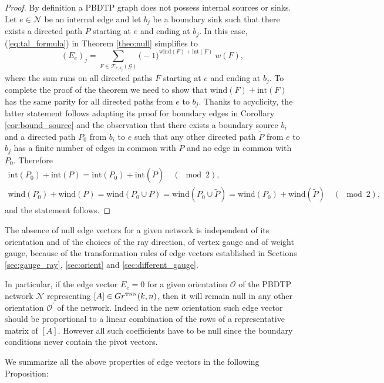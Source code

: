 \documentclass[11pt]{amsart}
\theoremstyle{plain}
\numberwithin{equation}{section}
\def \GTNN {{Gr^{\mbox{\tiny TNN}} (k,n)}}
\begin{document}
\begin{proof}
By definition a PBDTP graph does not possess internal sources or sinks.
Let $e\in {\mathcal N}$ be an internal edge and let $b_j$ be a boundary sink such that there exists a directed path $P$ starting at $e$ and ending at $b_j$.  In this case, (\ref{eq:tal_formula}) in Theorem \ref{theo:null} simplifies to
\[
\left(E_{e}\right)_{j}= \displaystyle\sum\limits_{F\in {\mathcal F}_{e,b_j}(\mathcal G)} \big(-1\big)^{\mbox{wind}(F)+\mbox{int}(F)}\ w(F),
\]
where the sum runs on all directed paths $F$ starting at $e$ and ending at $b_j$. To complete the proof of the theorem we need to show that $\mbox{wind}(F)+\mbox{int}(F)$ has the same parity for all directed paths from $e$ to $b_j$. Thanks to acyclicity, the latter statement follows adapting its proof for boundary edges in Corollary \ref{cor:bound_source} and the observation that there exists a boundary source $b_i$ and a directed path $P_0$ from $b_i$ to $e$ such that any other directed path ${\tilde P}$ from $e$ to $b_j$ has a finite number of edges in common with $P$
and no edge in common with $P_0$.
Therefore 
\[
\begin{array}{c}
\mbox{int} (P_0)+ \mbox{int}( P) =\mbox{int} (P_0) + \mbox{int} ({\tilde P}) \quad (\!\!\!\!\!\!\mod 2),\\
\mbox{wind} (P_0) +\mbox{wind} (P) =\mbox{wind} (P_0\cup P) = \mbox{wind} (P_0\cup {\tilde P})
= \mbox{wind} (P_0) + \mbox{wind} ({\tilde P}) \quad (\!\!\!\!\!\!\mod 2),
\end{array}
\]
and the statement follows.
\end{proof}

The absence of null edge vectors for a given network is independent of its orientation and of the choices of the ray direction, of vertex gauge and of weight gauge, because of the transformation rules of edge vectors established in Sections \ref{sec:gauge_ray}, \ref{sec:orient} and \ref{sec:different_gauge}. 

In particular, if the edge vector $E_e =0$ for a given orientation $\mathcal O$ of the PBDTP network ${\mathcal N}$ representing $[A]\in \GTNN$, then it will remain null in any other orientation ${\mathcal O}^{\prime}$ of the network. Indeed in the new orientation such edge vector should be proportional to a linear combination of the rows of a representative matrix of $[A]$. However all such coefficients have to be null since the boundary conditions never contain the pivot vectors.

We summarize all the above properties of edge vectors in the following Proposition:
\end{document}
